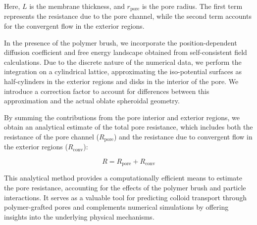 \documentclass[12pt, a4paper]{article}
\begin{document}
Here, $L$ is the membrane thickness, and $r_{\textrm{pore}}$ is the pore radius. The first term represents the resistance due to the pore channel, while the second term accounts for the convergent flow in the exterior regions.

In the presence of the polymer brush, we incorporate the position-dependent diffusion coefficient and free energy landscape obtained from self-consistent field calculations. Due to the discrete nature of the numerical data, we perform the integration on a cylindrical lattice, approximating the iso-potential surfaces as half-cylinders in the exterior regions and disks in the interior of the pore. We introduce a correction factor to account for differences between this approximation and the actual oblate spheroidal geometry.

By summing the contributions from the pore interior and exterior regions, we obtain an analytical estimate of the total pore resistance, which includes both the resistance of the pore channel ($R_{\textrm{pore}}$) and the resistance due to convergent flow in the exterior regions ($R_{\textrm{conv}}$):

\begin{equation} R = R_{\textrm{pore}} + R_{\textrm{conv}} \end{equation}

This analytical method provides a computationally efficient means to estimate the pore resistance, accounting for the effects of the polymer brush and particle interactions. It serves as a valuable tool for predicting colloid transport through polymer-grafted pores and complements numerical simulations by offering insights into the underlying physical mechanisms.



\end{document}
